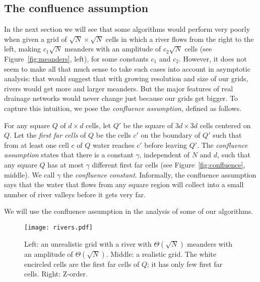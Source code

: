 \documentclass[10pt,a4paper]{article}
\begin{document}
\subsection{The confluence assumption}\label{sec:confluence}
In the next section we will see that some algorithms would perform very poorly when given a grid of $\sqrt N \times \sqrt N$ cells in which a river flows from the right to the left, making $c_1 \sqrt N$ meanders with an amplitude of $c_2 \sqrt N$ cells (see Figure~\ref{fig:meanders}, left), for some constants $c_1$ and $c_2$. However, it does not seem to make all that much sense to take such cases into account in asymptotic analysis: that would suggest that with growing resolution and size of our grids, rivers would get more and larger meanders. But the major features of real drainage networks would never change just because our grids get bigger. To capture this intuition, we pose the \emph{confluence assumption}, defined as follows.

For any square $Q$ of $d \times d$ cells, let $Q'$ be the square of $3d \times 3d$ cells centered on $Q$.
Let the \emph{first far cells} of $Q$ be the cells $c'$ on the boundary of $Q'$ such that from at least one cell $c$ of $Q$ water reaches $c'$ before leaving $Q'$. The \emph{confluence assumption} states that there is a constant $\gamma$, independent of $N$ and $d$, such that any square $Q$ has at most $\gamma$ different first far cells (see Figure~\ref{fig:confluence}, middle). We call $\gamma$ the \emph{confluence constant}.
Informally, the confluence assumption says that the water that flows from any square region will collect into a small number of river valleys before it gets very far.

We will use the confluence assumption in the analysis of some of our algorithms.
\begin{figure}
\centering\texttt{[image: rivers.pdf]}
\caption{Left: an unrealistic grid with a river with $\Theta(\sqrt N)$ meanders with an amplitude of $\Theta(\sqrt N)$.
Middle: a realistic grid. The white encircled cells are the first far cells of $Q$; it has only few first far cells.
Right: Z-order.}
\label{fig:meanders}\label{fig:confluence}\label{fig:zorder}
\end{figure}
\end{document}
